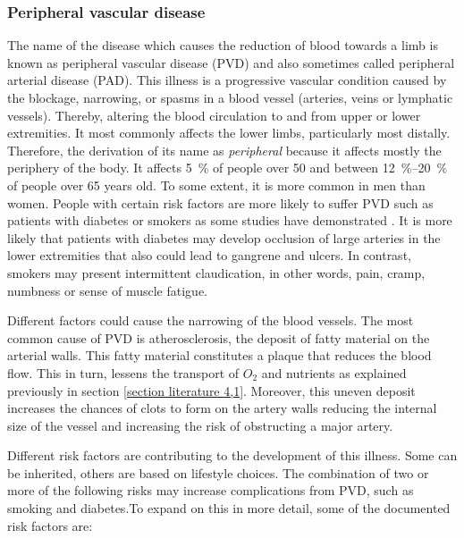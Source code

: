 \subsubsection{Peripheral vascular disease}
\label{section literature 2.1}
The name of the disease which causes the reduction of blood towards a limb is known as peripheral vascular disease (PVD) and also sometimes called peripheral arterial disease (PAD). This illness is a progressive vascular condition caused by the blockage, narrowing, or spasms in a blood vessel (arteries, veins or lymphatic vessels). Thereby, altering the blood circulation to and from upper or lower extremities.  It most commonly affects the lower limbs, particularly most distally. Therefore, the derivation of its name as \textit{peripheral} because it affects mostly the periphery of the body. It affects \SI{5}{\percent} of people over \num{50} and between \SIrange{12}{20}{\percent} of people over 65 years old. To some extent, it is more common in men than women. People with certain risk factors are more likely to suffer PVD such as patients with diabetes or smokers as some studies have demonstrated \cite{kannel1979diabetes,janka1980peripheral, menzoian1989symptomatology, eliasson2003cigarette, stephens2004cardiovascular}. It is more likely that patients with diabetes may develop occlusion of large arteries in the lower extremities that also could lead to gangrene and ulcers. In contrast, smokers may present intermittent claudication, in other words, pain, cramp, numbness or sense of muscle fatigue. 

Different factors could cause the narrowing of the blood vessels. The most common cause of PVD is atherosclerosis, the deposit of fatty material on the arterial walls. This fatty material constitutes a plaque that reduces the blood flow. This in turn, lessens the transport of $O_2$ and nutrients as explained previously in section \ref{section literature 4,1}. Moreover, this uneven deposit increases the chances of clots to form on the artery walls reducing the internal size of the vessel and increasing the risk of obstructing a major artery.

Different risk factors are contributing to the development of this illness. Some can be inherited, others are based on lifestyle choices. The combination of two or more of the following risks may increase complications from PVD, such as smoking and diabetes.To expand on this in more detail, some of the documented risk factors are: 

